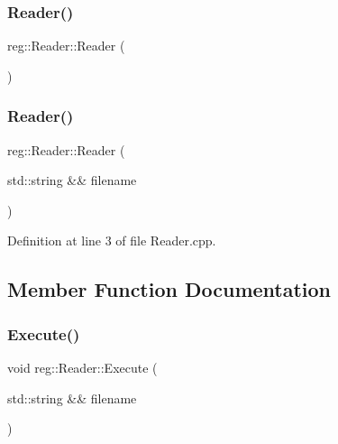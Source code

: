 \subsubsection{\texorpdfstring{Reader()}{Reader()}\hspace{0.1cm}{\footnotesize\ttfamily [1/2]}}
{\footnotesize\ttfamily reg\+::\+Reader\+::\+Reader (\begin{DoxyParamCaption}{ }\end{DoxyParamCaption})\hspace{0.3cm}{\ttfamily [default]}}

\mbox{\label{structreg_1_1_reader_a0c69ac8185cf110c693496eb86c1a734}} 
\subsubsection{\texorpdfstring{Reader()}{Reader()}\hspace{0.1cm}{\footnotesize\ttfamily [2/2]}}
{\footnotesize\ttfamily reg\+::\+Reader\+::\+Reader (\begin{DoxyParamCaption}\item[{std\+::string \&\&}]{filename }\end{DoxyParamCaption})}



Definition at line 3 of file Reader.\+cpp.



\subsection{Member Function Documentation}
\mbox{\label{structreg_1_1_reader_a5d87eae44d06ce2e055c6f3cd8b46241}} 
\subsubsection{\texorpdfstring{Execute()}{Execute()}}
{\footnotesize\ttfamily void reg\+::\+Reader\+::\+Execute (\begin{DoxyParamCaption}\item[{std\+::string \&\&}]{filename }\end{DoxyParamCaption})}



